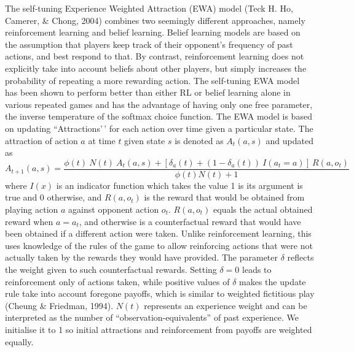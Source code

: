 \documentclass[
  english,
  man,floatsintext]{apa6}
\begin{document}
The self-tuning Experience Weighted Attraction (EWA) model (Teck H. Ho, Camerer, \& Chong, 2004) combines two seemingly different approaches, namely reinforcement learning and belief learning. Belief learning models are based on the assumption that players keep track of their opponent's frequency of past actions, and best respond to that. By contrast, reinforcement learning does not explicitly take into account beliefs about other players, but simply increases the probability of repeating a more rewarding action. The self-tuning EWA model has been shown to perform better than either RL or belief learning alone in various repeated games and has the advantage of having only one free parameter, the inverse temperature of the softmax choice function. The EWA model is based on updating ``Attractions'\,' for each action over time given a particular state. The attraction of action \(a\) at time \(t\) given state \(s\) is denoted as \(A_{t}(a, s)\) and updated as
\[ A_{t+1}(a,s) =  \frac{\phi(t) \ N(t) \ A_{t}(a,s) + [ \delta_{a}(t) + (1-\delta_{a}(t)) \ I(a_t = a )] \ R(a,o_t) } {\phi(t)N(t) + 1} \]
where \(I(x)\) is an indicator function which takes the value 1 is its argument is true and 0 otherwise, and \(R(a,o_t)\) is the reward that would be obtained from playing action \(a\) against opponent action \(o_t\). \(R(a,o_t)\) equals the actual obtained reward when \(a = a_t\), and otherwise is a counterfactual reward that would have been obtained if a different action were taken. Unlike reinforcement learning, this uses knowledge of the rules of the game to allow reinforcing actions that were not actually taken by the rewards they would have provided. The parameter \(\delta\) reflects the weight given to such counterfactual rewards. Setting \(\delta = 0\) leads to reinforcement only of actions taken, while positive values of \(\delta\) makes the update rule take into account foregone payoffs, which is similar to weighted fictitious play (Cheung \& Friedman, 1994). \(N(t)\) represents an experience weight and can be interpreted as the number of ``observation-equivalents'' of past experience. We initialise it to 1 so initial attractions and reinforcement from payoffs are weighted equally.
\end{document}
